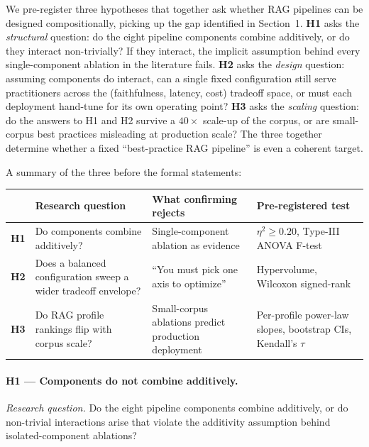 \documentclass[11pt]{article}
\begin{document}
We pre-register three hypotheses that together ask whether RAG
pipelines can be designed compositionally, picking up the gap
identified in Section~1.  \textbf{H1} asks the
\emph{structural} question: do the eight pipeline components combine
additively, or do they interact non-trivially?  If they interact, the
implicit assumption behind every single-component ablation in the
literature fails.  \textbf{H2} asks the \emph{design} question:
assuming components do interact, can a single fixed configuration
still serve practitioners across the (faithfulness, latency, cost)
tradeoff space, or must each deployment hand-tune for its own operating
point?  \textbf{H3} asks the \emph{scaling} question: do the answers
to H1 and H2 survive a $40\times$ scale-up of the corpus, or are
small-corpus best practices misleading at production scale?  The three
together determine whether a fixed ``best-practice RAG pipeline'' is
even a coherent target.

A summary of the three before the formal statements:

\begin{table}[h]
\centering
\footnotesize
\begin{tabular}{@{}p{0.8cm}p{4.4cm}p{4.4cm}p{4.0cm}@{}}
\toprule
& Research question & What confirming rejects & Pre-registered test \\
\midrule
\textbf{H1} & Do components combine additively? & Single-component ablation as evidence & $\eta^2 \geq 0.20$, Type-III ANOVA F-test \\
\addlinespace
\textbf{H2} & Does a balanced configuration sweep a wider tradeoff envelope? & ``You must pick one axis to optimize'' & Hypervolume, Wilcoxon signed-rank \\
\addlinespace
\textbf{H3} & Do RAG profile rankings flip with corpus scale? & Small-corpus ablations predict production deployment & Per-profile power-law slopes, bootstrap CIs, Kendall's $\tau$ \\
\bottomrule
\end{tabular}
\end{table}

\paragraph{H1 --- Components do not combine additively.}

\textit{Research question.} Do the eight pipeline components combine
additively, or do non-trivial interactions arise that violate the
additivity assumption behind isolated-component ablations?
\end{document}
